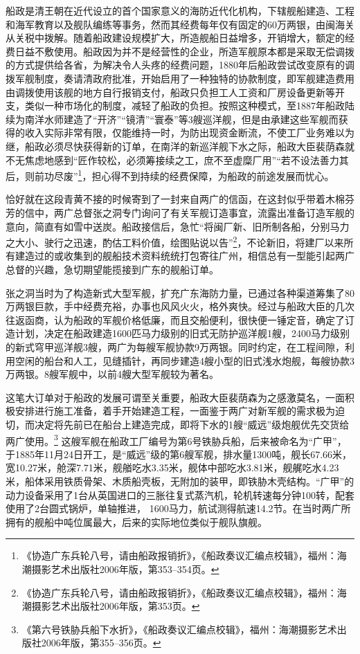 \documentclass[12pt,UTF8]{ctexbook}
\begin{document}
船政是清王朝在近代设立的首个国家意义的海防近代化机构，下辖舰船建造、工程和海军教育以及舰队编练等事务，然而其经费每年仅有固定的60万两银，由闽海关从关税中拨解。随着船政建设规模扩大，所造舰船日益增多，开销增大，额定的经费日益不敷使用。船政因为并不是经营性的企业，所造军舰原本都是采取无偿调拨的方式提供给各省，为解决令人头疼的经费问题，1880年后船政尝试改变原有的调拨军舰制度，奏请清政府批准，开始启用了一种独特的协款制度，即军舰建造费用由调拨使用该舰的地方自行报销支付，船政只负担工人工资和厂房设备更新等开支，类似一种市场化的制度，减轻了船政的负担。按照这种模式，至1887年船政陆续为南洋水师建造了“开济”“镜清”“寰泰”等3艘巡洋舰，但是由承建这些军舰而获得的收入实际非常有限，仅能维持一时，为防出现资金断流，不使工厂业务难以为继，船政必须尽快获得新的订单，在南洋的新巡洋舰下水之际，船政大臣裴荫森就不无焦虑地感到“匠作较松，必须筹接续之工，庶不至虚糜厂用”“若不设法善力其后，则前功尽废”\footnote{《协造广东兵轮八号，请由船政报销折》，《船政奏议汇编点校辑》，福州：海潮摄影艺术出版社2006年版，第353--354页。}，担心得不到持续的经费保障，为船政的前途发展而忧心。

恰好就在这段青黄不接的时候寄到了一封来自两广的信函，在这封似乎带着木棉芬芳的信中，两广总督张之洞专门询问了有关军舰订造事宜，流露出准备订造军舰的意向，简直有如雪中送炭。船政接信后，急忙“将闽厂新、旧所制各船，分别马力之大小、驶行之迅速，酌估工料价值，绘图贴说以告”\footnote{《协造广东兵轮八号，请由船政报销折》，《船政奏议汇编点校辑》，福州：海潮摄影艺术出版社2006年版，第353页。}，不论新旧，将建厂以来所有建造过的或收集到的舰船技术资料统统打包寄往广州，相信总有一型能引起两广总督的兴趣，急切期望能揽接到广东的舰船订单。

张之洞当时为了构造新式大型军舰，扩充广东海防力量，已通过各种渠道筹集了80万两银巨款，手中经费充裕，办事也风风火火，格外爽快。经过与船政大臣的几次往返函商，认为船政的军舰价格低廉，而且交船便利，很快便一锤定音，确定了订造计划，决定在船政建造1600匹马力级别的旧式无防护巡洋舰1艘，2400马力级别的新式穹甲巡洋舰3艘，两广为每艘军舰协款9万两银。同时约定，在工程间隙，利用空闲的船台和人工，见缝插针，再同步建造4艘小型的旧式浅水炮舰，每艘协款3万两银。8艘军舰中，以前4艘大型军舰较为著名。

这笔大订单对于船政的发展可谓至关重要，船政大臣裴荫森为之感激莫名，一面积极安排进行施工准备，着手开始建造工程，一面鉴于两广对新军舰的需求极为迫切，而决定将先前已在船台上建造完成，即将下水的1艘“威远”级炮舰优先交货给两广使用。\footnote{《第六号铁胁兵船下水折》，《船政奏议汇编点校辑》，福州：海潮摄影艺术出版社2006年版，第355--356页。} 这艘军舰在船政工厂编号为第6号铁胁兵船，后来被命名为“广甲”，于1885年11月24日开工，是“威远”级的第6艘军舰，排水量1300吨，舰长67.66米，宽10.27米，舱深7.71米，舰艏吃水3.35米，舰体中部吃水3.81米，舰艉吃水4.23米，船体采用铁质骨架、木质船壳板，无附加的装甲，即铁胁木壳结构。“广甲”的动力设备采用了1台从英国进口的三胀往复式蒸汽机，轮机转速每分钟100转，配套使用了2台圆式锅炉，单轴推进， 1600马力，航试测得航速14.2节。在当时两广所拥有的舰船中吨位属最大，后来的实际地位类似于舰队旗舰。
\end{document}

